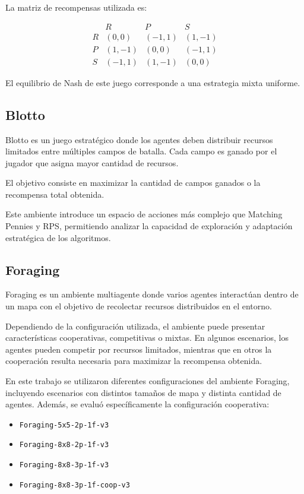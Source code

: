 \documentclass[letterpaper,12pt]{article} %
\begin{document}
La matriz de recompensas utilizada es:

\[
\begin{array}{c|ccc}
 & R & P & S \\
\hline
R & (0,0) & (-1,1) & (1,-1) \\
P & (1,-1) & (0,0) & (-1,1) \\
S & (-1,1) & (1,-1) & (0,0)
\end{array}
\]

El equilibrio de Nash de este juego corresponde a una estrategia mixta uniforme.


\subsection{Blotto}

Blotto es un juego estratégico donde los agentes deben distribuir recursos limitados entre múltiples campos de batalla. Cada campo es ganado por el jugador que asigna mayor cantidad de recursos.

El objetivo consiste en maximizar la cantidad de campos ganados o la recompensa total obtenida.

Este ambiente introduce un espacio de acciones más complejo que Matching Pennies y RPS, permitiendo analizar la capacidad de exploración y adaptación estratégica de los algoritmos.


\subsection{Foraging}

Foraging es un ambiente multiagente donde varios agentes interactúan dentro de un mapa con el objetivo de recolectar recursos distribuidos en el entorno.

Dependiendo de la configuración utilizada, el ambiente puede presentar características cooperativas, competitivas o mixtas. En algunos escenarios, los agentes pueden competir por recursos limitados, mientras que en otros la cooperación resulta necesaria para maximizar la recompensa obtenida.

En este trabajo se utilizaron diferentes configuraciones del ambiente Foraging, incluyendo escenarios con distintos tamaños de mapa y distinta cantidad de agentes. Además, se evaluó específicamente la configuración cooperativa:

\begin{itemize}
    \item \texttt{Foraging-5x5-2p-1f-v3}
    \item \texttt{Foraging-8x8-2p-1f-v3}
    \item \texttt{Foraging-8x8-3p-1f-v3}
    \item \texttt{Foraging-8x8-3p-1f-coop-v3}
\end{itemize}
\end{document}
